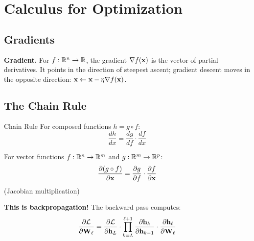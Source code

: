 \section{Calculus for Optimization}
\label{sec:calculus}

\subsection{Gradients}

\textbf{Gradient.} For $f: \mathbb{R}^n \to \mathbb{R}$, the gradient $\nabla f(\mathbf{x})$ is the vector of partial derivatives. It points in the direction of steepest ascent; gradient descent moves in the opposite direction: $\mathbf{x} \leftarrow \mathbf{x} - \eta \nabla f(\mathbf{x})$.

\subsection{The Chain Rule}

\begin{mathresult}{Chain Rule}
For composed functions $h = g \circ f$:
\begin{equation}
\frac{dh}{dx} = \frac{dg}{df} \cdot \frac{df}{dx}
\end{equation}

For vector functions $f: \mathbb{R}^n \to \mathbb{R}^m$ and $g: \mathbb{R}^m \to \mathbb{R}^p$:
\begin{equation}
\frac{\partial (g \circ f)}{\partial \mathbf{x}} = \frac{\partial g}{\partial f} \cdot \frac{\partial f}{\partial \mathbf{x}}
\end{equation}
(Jacobian multiplication)
\end{mathresult}

\textbf{This is backpropagation!} The backward pass computes:
\begin{equation}
\frac{\partial \mathcal{L}}{\partial \mathbf{W}_\ell} = \frac{\partial \mathcal{L}}{\partial \mathbf{h}_L} \cdot \prod_{k=L}^{\ell+1} \frac{\partial \mathbf{h}_k}{\partial \mathbf{h}_{k-1}} \cdot \frac{\partial \mathbf{h}_\ell}{\partial \mathbf{W}_\ell}
\end{equation}

